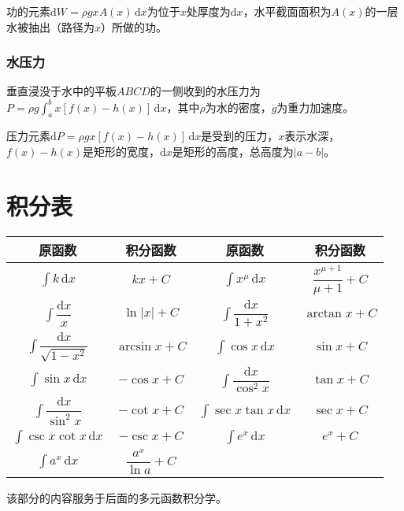 \documentclass[UTF8, 12pt]{ctexart}
\begin{document}
        功的元素$\textrm{d}W=\rho gxA(x)\,\textrm{d}x$为位于$x$处厚度为$\textrm{d}x$，水平截面面积为$A(x)$的一层水被抽出（路径为$x$）所做的功。

        \subsubsection{水压力}

        垂直浸没于水中的平板$ABCD$的一侧收到的水压力为$P=\rho g\int_a^bx[f(x)-h(x)]\,\textrm{d}x$，其中$\rho$为水的密度，$g$为重力加速度。

        压力元素$\textrm{d}P=\rho gx[f(x)-h(x)]\,\textrm{d}x$是受到的压力，$x$表示水深，$f(x)-h(x)$是矩形的宽度，$\textrm{d}x$是矩形的高度，总高度为$\vert a-b\vert$。

        \section{积分表}

        \begin{center}
            \begin{tabular}{|c|c|c|c|}
                \hline
                原函数 & 积分函数 & 原函数 & 积分函数\\ \hline
                $\int k\,\textrm{d}x$ & $kx+C$ & $\int x^\mu\,\textrm{d}x$ & $\dfrac{x^{\mu+1}}{\mu+1}+C$ \\ \hline
                $\int\dfrac{\textrm{d}x}{x}$ & $\ln\vert x\vert+C$ & $\int\dfrac{\textrm{d}x}{1+x^2}$ & $\arctan x+C$ \\ \hline
                $\int\dfrac{\textrm{d}x}{\sqrt{1-x^2}}$ & $\arcsin x+C$ & $\int\cos x\,\textrm{d}x$ & $\sin x+C$ \\ \hline
                $\int\sin x\,\textrm{d}x$ & $-\cos x+C$ & $\int\dfrac{\textrm{d}x}{\cos^2x}$ & $\tan x+C$ \\ \hline
                $\int\dfrac{\textrm{d}x}{\sin^2x}$ & $-\cot x+C$ & $\int\sec x\tan x\,\textrm{d}x$ & $\sec x+C$ \\ \hline
                $\int\csc x\cot x\,\textrm{d}x$ & $-\csc x+C$ & $\int e^x\,\textrm{d}x$ & $e^x+C$ \\ \hline
                $\int a^x\,\textrm{d}x$ & $\dfrac{a^x}{\ln a}+C$ & & \\
                \hline
            \end{tabular}
        \end{center}

        该部分的内容服务于后面的多元函数积分学。
\end{document}
